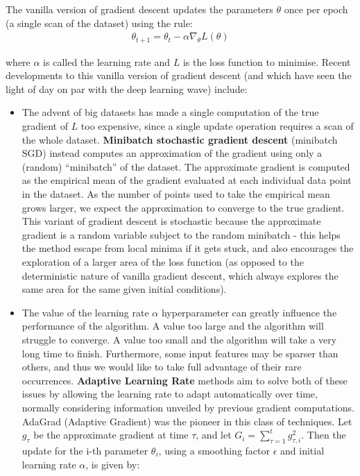 \documentclass[pdftex,11pt,a4paper]{article}
\theoremstyle{definition}
\theoremstyle{remark}
\begin{document}
\par The vanilla version of gradient descent updates the parameters $\theta$ once per epoch (a single scan of the dataset) using the rule:
\begin{align*}
    \theta_{t+1} = \theta_{t} - \alpha \nabla_\theta L(\theta) 
\end{align*}

where $\alpha$ is called the learning rate and $L$ is the loss function to minimise. Recent developments to this vanilla version of gradient descent (and which have seen the light of day on par with the deep learning wave) include:

\begin{itemize}
    \item The advent of big datasets has made a single computation of the true gradient of $L$ too expensive, since a single update operation requires a scan of the whole dataset. \textbf{Minibatch stochastic gradient descent} (minibatch SGD) \cite{Bottou2010} instead computes an approximation of the gradient using only a (random) ``minibatch'' of the dataset. The approximate gradient is computed as the empirical mean of the gradient evaluated at each individual data point in the dataset. As the number of points used to take the empirical mean grows larger, we expect the approximation to converge to the true gradient. This variant of gradient descent is stochastic because the approximate gradient is a random variable subject to the random minibatch - this helps the method escape from local minima if it gets stuck, and also encourages the exploration of a larger area of the loss function (as opposed to the deterministic nature of vanilla gradient descent, which always explores the same area for the same given initial conditions).
    \item The value of the learning rate $\alpha$ hyperparameter can greatly influence the performance of the algorithm. A value too large and the algorithm will struggle to converge. A value too small and the algorithm will take a very long time to finish. Furthermore, some input features may be sparser than others, and thus we would like to take full advantage of their rare occurrences. \textbf{Adaptive Learning Rate} methods aim to solve both of these issues by allowing the learning rate to adapt automatically over time, normally considering information unveiled by previous gradient computations. AdaGrad (Adaptive Gradient) \cite{Duchi2011} was the pioneer in this class of techniques. Let $g_\tau$ be the approximate gradient at time $\tau$, and let $G_i=\sum_{\tau=1}^t g_{\tau, i}^2$. Then the update for the i-th parameter $\theta_i$, using a smoothing factor $\epsilon$ and initial learning rate $\alpha$, is given by:

\end{itemize}
\end{document}
